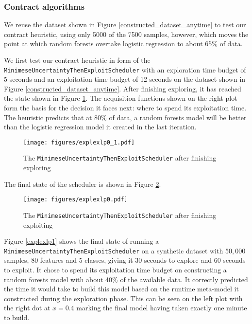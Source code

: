 \documentclass[a4paper,12pt,twoside,openright]{report}
\begin{document}
\subsubsection{Contract algorithms}

We reuse the dataset shown in Figure \ref{constructed_dataset_anytime} to test our contract heuristic, using only 5000 of the 7500 samples, however, which moves the point at which random forests overtake logistic regression to about 65\% of data.

We first test our contract heuristic in form of the \texttt{MinimeseUncertaintyThenExploitScheduler} with an exploration time budget of 5 seconds and an exploitation time budget of 12 seconds on the dataset shown in Figure \ref{constructed_dataset_anytime}. After finishing exploring, it has reached the state shown in Figure \ref{explexlp0_1}. The acquisition functions shown on the right plot form the basis for the decision it faces next: where to spend its exploitation time. The heuristic predicts that at 80\% of data, a random forests model will be better than the logistic regression model it created in the last iteration.

\begin{figure}
\centering
  \texttt{[image: figures/explexlp0\_1.pdf]}
  \caption{The \texttt{MinimeseUncertaintyThenExploitScheduler} after finishing exploring}
  \label{explexlp0_1}
\end{figure}

The final state of the scheduler is shown in Figure \ref{explexlp0}. 


\begin{figure}
\centering
  \texttt{[image: figures/explexlp0.pdf]}
  \caption{The \texttt{MinimeseUncertaintyThenExploitScheduler} after finishing exploiting}
  \label{explexlp0}
\end{figure}


Figure \ref{explexlp1} shows the final state of running a \texttt{MinimeseUncertaintyThenExploitScheduler} on a synthetic dataset with $50,000$ samples, $80$ features and $5$ classes, giving it 30 seconds to explore and 60 seconds to exploit. It chose to spend its exploitation time budget on constructing a random forests model with about 40\% of the available data. It correctly predicted the time it would take to build this model based on the runtime meta-model it constructed during the exploration phase. This can be seen on the left plot with the right dot at $x=0.4$ marking the final model having taken exactly one minute to build.
\end{document}

